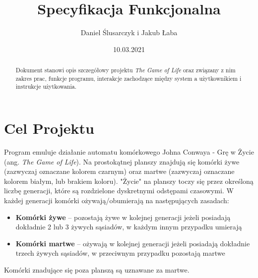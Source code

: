 \documentclass[11pt,a4paper]{report}
\title{\Huge Specyfikacja Funkcjonalna}
\author{Daniel Ślusarczyk i Jakub Łaba}
\date{10.03.2021}
\begin{document}
\maketitle

\renewcommand*\thesection{\arabic{section}} 

\begin{abstract}
Dokument stanowi opis szczegółowy projektu \textsl{The Game of Life} oraz związany z nim zakres prac, funkcje programu, interakcje zachodzące między system
a użytkownikiem i instrukcje użytkowania. 
\end{abstract}

\pagestyle{fancy}
\fancyhf{}
\setcounter{page}{0}

{
\fancyhead{} 
\fancyfoot{} 
}
\thispagestyle{empty} 
\tableofcontents 
\thispagestyle{empty}
\newpage

{
\fancyhead{} 
\fancyfoot[C]{\thepage}
}

\section{Cel Projektu}\label{sec:tekst}
Program emuluje działanie automatu komórkowego Johna Conwaya - Grę w Życie (ang. \textsl{The Game of Life}).
Na prostokątnej planszy znajdują się komórki żywe (zazwyczaj oznaczane kolorem czarnym) oraz martwe (zazwyczaj oznaczane kolorem białym, lub brakiem koloru).
"Życie" na planszy toczy się przez określoną liczbę generacji, które są rozdzielone dyskretnymi odstępami czasowymi.
W każdej generacji komórki ożywają/obumierają na następujących zasadach:
\begin {itemize}
\item\textbf {Komórki żywe} -- pozostają żywe w kolejnej generacji jeżeli posiadają dokładnie 2 lub 3 żywych sąsiadów, w każdym innym przypadku umierają
\item\textbf {Komórki martwe} -- ożywają w kolejnej generacji jeżeli posiadają dokładnie trzech żywych sąsiadów, w przeciwnym przypadku pozostają martwe
\end {itemize}
Komórki znadujące się poza planszą są uznawane za martwe. 

\end{document}
